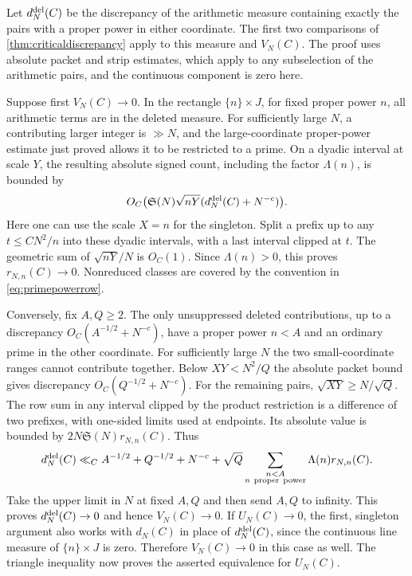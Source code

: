 \documentclass[11pt,a4paper]{article}
\numberwithin{equation}{section}
\newcommand{\SSS}{\mathfrak S}
\begin{document}
Let $d_N^{\rm del}(C)$ be the discrepancy of the
arithmetic measure containing exactly the pairs with
a proper power in either coordinate. The first two
comparisons of \cref{thm:criticaldiscrepancy} apply to
this measure and $V_N(C)$. The proof uses absolute
packet and strip estimates, which apply to any
subselection of the arithmetic pairs, and the
continuous component is zero here.

Suppose first $V_N(C)\to0$. In the rectangle
$\{n\}\times J$, for fixed proper power $n$, all
arithmetic terms are in the deleted measure. For
sufficiently large $N$, a contributing larger integer
is $\gg N$, and the large-coordinate proper-power
estimate just proved allows it to be restricted to a
prime. On a dyadic interval at scale $Y$, the resulting
absolute signed count, including the factor $\Lambda(n)$,
is bounded by
\[
 O_C\bigl(\SSS(N)\sqrt{nY}
                (d_N^{\rm del}(C)+N^{-c})\bigr).
\]
Here one can use the scale $X=n$ for the singleton.
Split a prefix up to any $t\le CN^2/n$ into these
dyadic intervals, with a last interval clipped at $t$.
The geometric sum of $\sqrt{nY}/N$ is $O_C(1)$.
Since $\Lambda(n)>0$, this proves $r_{N,n}(C)\to0$.
Nonreduced classes are covered by the convention
in \cref{eq:primepowerrow}.

Conversely, fix $A,Q\ge2$. The only unsuppressed
deleted contributions, up to a discrepancy
$O_C(A^{-1/2}+N^{-c})$, have a proper power $n<A$
and an ordinary prime in the other coordinate.
For sufficiently large $N$ the two small-coordinate
ranges cannot contribute together. Below
$XY<N^2/Q$ the absolute packet bound gives discrepancy
$O_C(Q^{-1/2}+N^{-c})$. For the remaining pairs,
$\sqrt{XY}\ge N/\sqrt Q$. The row sum in any interval
clipped by the product restriction is a difference of
two prefixes, with one-sided limits used at endpoints.
Its absolute value is bounded by
$2N\SSS(N)r_{N,n}(C)$. Thus
\begin{equation}
 d_N^{\rm del}(C)
  \ll_C A^{-1/2}+Q^{-1/2}+N^{-c}
       +\sqrt Q\sum_{\substack{n<A\\ n\ {\rm proper\ power}}}
                    \Lambda(n)r_{N,n}(C).
 \label{eq:primepowerrowsufficiency}
\end{equation}
Take the upper limit in $N$ at fixed $A,Q$ and then
send $A,Q$ to infinity. This proves $d_N^{\rm del}(C)\to0$
and hence $V_N(C)\to0$. If $U_N(C)\to0$, the first,
singleton argument also works with $d_N(C)$ in place
of $d_N^{\rm del}(C)$, since the continuous line measure
of $\{n\}\times J$ is zero. Therefore $V_N(C)\to0$ in
this case as well. The triangle inequality now proves
the asserted equivalence for $U_N(C)$.
\end{document}
